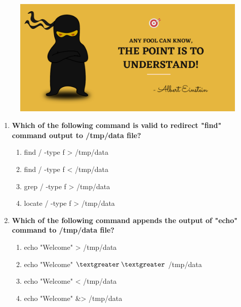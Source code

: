 \setlength{\columnsep}{3pt}
\begin{flushleft}
	
	\paragraph{}
	\bigskip
	
	\begin{figure}[h!]
		\centering
		\includegraphics[scale=.2]{content/practise.jpg}
	\end{figure}	
	\begin{enumerate}
		\item \textbf{Which of the following command is valid to redirect "find" command output to \textbf{/tmp/data} file?}
		\begin{enumerate}[label=(\alph*)]
			\item find / -type f > /tmp/data   %
			\item find / -type f < /tmp/data   
			\item grep / -type f > /tmp/data   
			\item locate / -type f > /tmp/data
		\end{enumerate}
		\bigskip
		\bigskip	
		
		\item \textbf{Which of the following command appends the output of \textbf{"echo"} command to \textbf{/tmp/data} file?}
		\begin{enumerate}[label=(\alph*)]
			\item echo "Welcome" > /tmp/data
			\item echo "Welcome" {$\textgreater$}{$\textgreater$} /tmp/data  %
			\item echo "Welcome" < /tmp/data
			\item echo "Welcome" \&> /tmp/data
		\end{enumerate}
		\bigskip
		\bigskip
		

\end{enumerate}
\end{flushleft}
